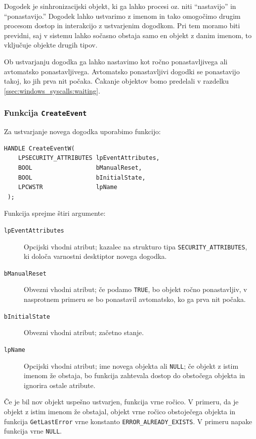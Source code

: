 \documentclass[a4paper,12pt,openright]{book}
\begin{document}
Dogodek je sinhronizacijski objekt, ki ga lahko procesi oz. niti ``nastavijo'' in ``ponastavijo.''
Dogodek lahko ustvarimo z imenom in tako omogočimo drugim procesom dostop in interakcijo z ustvarjenim dogodkom.
Pri tem moramo biti previdni, saj v sistemu lahko sočasno obstaja samo en objekt z danim imenom, to vključuje objekte drugih tipov.

Ob ustvarjanju dogodka ga lahko nastavimo kot ročno ponastavljivega ali avtomatsko ponastavljivega.
Avtomatsko ponastavljivi dogodki se ponastavijo takoj, ko jih prva nit počaka.
Čakanje objektov bomo predelali v razdelku \ref{ssec:windows_syscalls:waiting}.

\subsubsection{Funkcija \texttt{CreateEvent}}

Za ustvarjanje novega dogodka uporabimo funkcijo:
\begin{lstlisting}[style=func]
 HANDLE CreateEventW(
	LPSECURITY_ATTRIBUTES lpEventAttributes,
	BOOL                  bManualReset,
	BOOL                  bInitialState,
	LPCWSTR               lpName
 );
\end{lstlisting}

Funkcija sprejme štiri argumente:
\begin{description}
	\item[\texttt{lpEventAttributes}] Opcijski vhodni atribut; kazalec na strukturo tipa \texttt{SE\-CURITY\_ATTRIBUTES}, ki določa varnostni desktiptor novega dogodka.
	\item[\texttt{bManualReset}] Obvezni vhodni atribut; če podamo \texttt{TRUE}, bo objekt ročno ponastavljiv, v nasprotnem primeru se bo ponastavil avtomatsko, ko ga prva nit počaka.
	\item[\texttt{bInitialState}] Obvezni vhodni atribut; začetno stanje.
	\item[\texttt{lpName}] Opcijski vhodni atribut; ime novega objekta ali \texttt{NULL}; če objekt z istim imenom že obstaja, bo funkcija zahtevala dostop do obstočega objekta in ignorira ostale atribute.
\end{description}

Če je bil nov objekt uspešno ustvarjen, funkcija vrne ročico.
V primeru, da je objekt z istim imenom že obstajal, objekt vrne ročico obstoječega objekta in funkcija \texttt{GetLastError} vrne konstanto \texttt{ERROR\_ALREADY\_EXISTS}.
V primeru napake funkcija vrne \texttt{NULL}.
\end{document}

